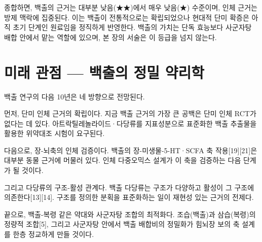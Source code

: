 \documentclass[12pt,oneside]{book}
\begin{document}
\vspace{2pt}\vspace{3pt}

종합하면, 백출의 근거는 대부분 낮음(★★)에서 매우 낮음(★) 수준이며, 인체 근거는 방제 맥락에 집중된다. 이는 백출이 전통적으로는 확립되었으나 현대적 단미 확증은 아직 초기 단계인 원료임을 정직하게 반영한다. 백출의 가치는 단독 효능보다 사군자탕 배합 안에서 맡는 역할에 있으며, 본 장의 서술은 이 등급을 넘지 않는다.

\section{미래 관점 — 백출의 정밀 약리학}

백출 연구의 다음 10년은 네 방향으로 전망된다.

먼저, 단미 인체 근거의 확립이다. 지금 백출 근거의 가장 큰 공백은 단미 인체 RCT가 없다는 데 있다. 아트락틸레놀라이드·다당류를 지표성분으로 표준화한 백출 추출물을 활용한 위약대조 시험이 요구된다.

다음으로, 장-뇌축의 인체 검증이다. 백출의 장-미생물-5-HT·SCFA 축 작용[19][21]은 대부분 동물 근거에 머물러 있다. 인체 다중오믹스 설계가 이 축을 검증하는 다음 단계가 될 것이다.

그리고 다당류의 구조-활성 관계다. 백출 다당류는 구조가 다양하고 활성이 그 구조에 의존한다[13][14]. 구조를 정의한 분획을 표준화하는 일이 재현성 있는 근거의 전제다.

끝으로, 백출-복령 같은 약대와 사군자탕 조합의 최적화다. 조습(백출)과 삼습(복령)의 정량적 조합[5], 그리고 사군자탕 안에서 백출 배합비의 정밀화가 힘뇌장 보의 축 설계를 한층 정교하게 만들 것이다.
\end{document}
